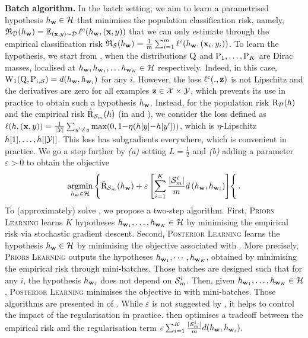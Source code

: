 \textbf{Batch algorithm.} In the batch setting, we aim to learn a parametrised hypothesis $h_{\wbf}\in\H$ that minimises the population classification risk, namely,  $\Rfrak_{\D}(h_{\wbf}) = \EE_{(\x, y)\sim\D}\loss^{c}(h_{\wbf}, (\x, y))$ that we can only estimate through the empirical classification risk $\Rfrak_{\S}(h_{\wbf}) = \frac{1}{m}\sum_{i=1}^{m}\loss^{c}(h_{\wbf}, (\x_i, y_i))$.
To learn the hypothesis, we start from , when the distributions $\Q$ and $\P_1,\dots, \P_K$ are Dirac masses, localised at $h_{\wbf}, h_{\wbf_1},\dots h_{\wbf_K}\in\H$ respectively.
Indeed, in this case, $\W_{1}(\Q, \P_{i,\S}) = d(h_{\wbf}, h_{\wbf_i})$ for any $i$.
However, the loss $\loss^{c}(.,\z)$ is not Lipschitz and the derivatives are zero for all examples $\z\in\X\times\Y$, which prevents its use in practice to obtain such a hypothesis $h_{\wbf}$.
Instead, for the population risk $\Risk_{\D}(h)$ and the empirical risk $\Riskhat_{\Sm}(h)$ (in  and ), we consider the loss defined as $\loss(h, (\x, y)) = \frac{1}{|\Y|}\sum_{y'\ne y} \max(0, 1{-} \eta(h[y]{-}h[y']))$, which is $\eta$-Lipschitz \wrt $h[1],\dots, h[|\Y|]$.
This loss has subgradients everywhere, which is convenient in practice.
We go a step further by {\it (a)}  setting $L=\frac{1}{2}$ and {\it (b)} adding a parameter $\varepsilon>0$ to obtain the objective
\begin{align}
    \label{eq:batch-alg-exp}
    \argmin_{h_{\wbf}\in\Hcal}\left\{ \Riskhat_{\Sm}(h_{\wbf}) + \varepsilon\LB\sum_{i=1}^{K} \frac{|\Sm^{i}|}{m} d\LP h_\wbf,h_{\wbf_i}\RP\RB\right\{.
\end{align}
To (approximately) solve , we propose a two-step algorithm.
First, \textsc{Priors Learning} learns $K$ hypotheses $h_{\wbf_1}, \dots, h_{\wbf_K} \in \H$ by minimising the empirical risk via stochastic gradient descent.
Second, \textsc{Posterior Learning} learns the hypothesis $h_{\wbf}\in\H$ by minimising the objective associated with .
More precisely, \textsc{Priors Learning} outputs the hypotheses $h_{\wbf_1},\cdots,h_{\wbf_K}$, obtained by minimising the empirical risk through mini-batches.
Those batches are designed such that for any $i$, the hypothesis $h_{\wbf_i}$ does not depend on $\Sm^{i}$.
Then, given $h_{\wbf_1}, \dots, h_{\wbf_K} \in \H$, \textsc{Posterior Learning} minimises the objective in  with mini-batches.
Those algorithms are presented in  of .
While $\varepsilon$ is not suggested by , it helps to control the impact of the regularisation in practice.
 then optimises a tradeoff between the empirical risk and the regularisation term $\varepsilon\sum_{i=1}^{K} \frac{|\Sm^{i}|}{m} d(h_{\wbf}, h_{\wbf_i})$.

